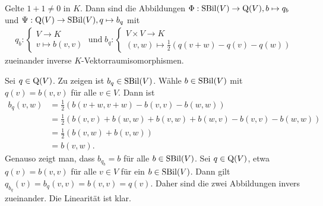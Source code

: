 \documentclass[../../main.tex]{subfiles}
\begin{document}
\begin{notpro}\label{13.4.6}
	Gelte $1+1\neq 0$ in $K$. Dann sind die Abbildungen $\Phi:\operatorname{SBil}(V)\to \operatorname{Q}(V),b\mapsto q_b$ und $\Psi:\operatorname{Q}(V)\to \operatorname{SBil}(V),q\mapsto b_q$ mit 
	\begin{align*}
		q_b:\begin{cases} V\to K\\ v\mapsto b(v,v)\end{cases}\;\text{und}\;
		b_q:\begin{cases} V\times V\to K\\ (v,w)\mapsto \frac{1}{2}\left(q(v+w)-q(v)-q(w)\right)\end{cases}
	\end{align*}
	zueinander inverse $K$-Vektorraumisomorphismen. 
\end{notpro}	
\begin{cproof}
	Sei $q\in \operatorname{Q}(V)$. Zu zeigen ist $b_q\in \operatorname{SBil}(V)$. Wähle $b\in \operatorname{SBil}(V)$ mit $q(v)=b(v,v)$ für alle $v\in V$. Dann ist
	\begin{align*}
		b_q(v,w)&=\frac{1}{2}\left(b(v+w,v+w)-b(v,v)-b(w,w)\right)\\
		&=\frac{1}{2}\left(b(v,v)+b(w,w)+b(v,w)+b(w,v)-b(v,v)-b(w,w)\right)\\
		&=\frac{1}{2}\left(b(v,w)+b(v,w)\right)\\
		&=b(v,w).
	\end{align*}
	Genauso zeigt man, dass $b_{q_b}=b$ für alle $b\in \operatorname{SBil}(V)$. Sei $q\in \operatorname{Q}(V)$, etwa $q(v)=b(v,v)$ für alle $v\in V$ für ein $b\in \operatorname{SBil}(V)$. Dann gilt $q_{b_q}(v)=b_q(v,v)=b(v,v)=q(v)$. Daher sind die zwei Abbildungen invers zueinander. Die Linearität ist klar.
\end{cproof}
\end{document}
